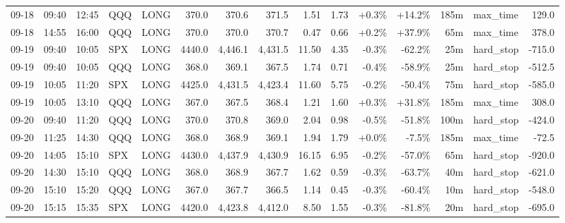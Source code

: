 \documentclass[11pt,a4paper,twoside]{article}
\begin{document}
\begin{landscape}
\begin{center}
\begin{longtable}{>{\color{txtmain}}l l l l l r r r r r r r r >{\color{txtmain}}l r}
09-18 & 09:40 & 12:45 & QQQ & LONG & 370.0 & 370.6 & 371.5 & 1.51 & 1.73 & \textcolor{wingreen}{+0.3\%} & \textcolor{wingreen}{+14.2\%} & 185m & max\_time & \textcolor{wingreen}{129.0} \\
09-18 & 14:55 & 16:00 & QQQ & LONG & 370.0 & 370.0 & 370.7 & 0.47 & 0.66 & \textcolor{wingreen}{+0.2\%} & \textcolor{wingreen}{+37.9\%} & 65m & max\_time & \textcolor{wingreen}{378.0} \\
09-19 & 09:40 & 10:05 & SPX & LONG & 4440.0 & 4,446.1 & 4,431.5 & 11.50 & 4.35 & \textcolor{lossred}{-0.3\%} & \textcolor{lossred}{-62.2\%} & 25m & hard\_stop & \textcolor{lossred}{-715.0} \\
09-19 & 09:40 & 10:05 & QQQ & LONG & 368.0 & 369.1 & 367.5 & 1.74 & 0.71 & \textcolor{lossred}{-0.4\%} & \textcolor{lossred}{-58.9\%} & 25m & hard\_stop & \textcolor{lossred}{-512.5} \\
09-19 & 10:05 & 11:20 & SPX & LONG & 4425.0 & 4,431.5 & 4,423.4 & 11.60 & 5.75 & \textcolor{lossred}{-0.2\%} & \textcolor{lossred}{-50.4\%} & 75m & hard\_stop & \textcolor{lossred}{-585.0} \\
09-19 & 10:05 & 13:10 & QQQ & LONG & 367.0 & 367.5 & 368.4 & 1.21 & 1.60 & \textcolor{wingreen}{+0.3\%} & \textcolor{wingreen}{+31.8\%} & 185m & max\_time & \textcolor{wingreen}{308.0} \\
09-20 & 09:40 & 11:20 & QQQ & LONG & 370.0 & 370.8 & 369.0 & 2.04 & 0.98 & \textcolor{lossred}{-0.5\%} & \textcolor{lossred}{-51.8\%} & 100m & hard\_stop & \textcolor{lossred}{-424.0} \\
09-20 & 11:25 & 14:30 & QQQ & LONG & 368.0 & 368.9 & 369.1 & 1.94 & 1.79 & \textcolor{wingreen}{+0.0\%} & \textcolor{lossred}{-7.5\%} & 185m & max\_time & \textcolor{lossred}{-72.5} \\
09-20 & 14:05 & 15:10 & SPX & LONG & 4430.0 & 4,437.9 & 4,430.9 & 16.15 & 6.95 & \textcolor{lossred}{-0.2\%} & \textcolor{lossred}{-57.0\%} & 65m & hard\_stop & \textcolor{lossred}{-920.0} \\
09-20 & 14:30 & 15:10 & QQQ & LONG & 368.0 & 368.9 & 367.7 & 1.62 & 0.59 & \textcolor{lossred}{-0.3\%} & \textcolor{lossred}{-63.7\%} & 40m & hard\_stop & \textcolor{lossred}{-621.0} \\
09-20 & 15:10 & 15:20 & QQQ & LONG & 367.0 & 367.7 & 366.5 & 1.14 & 0.45 & \textcolor{lossred}{-0.3\%} & \textcolor{lossred}{-60.4\%} & 10m & hard\_stop & \textcolor{lossred}{-548.0} \\
09-20 & 15:15 & 15:35 & SPX & LONG & 4420.0 & 4,423.8 & 4,412.0 & 8.50 & 1.55 & \textcolor{lossred}{-0.3\%} & \textcolor{lossred}{-81.8\%} & 20m & hard\_stop & \textcolor{lossred}{-695.0} \\

\end{longtable}
\end{center}
\end{landscape}
\end{document}

